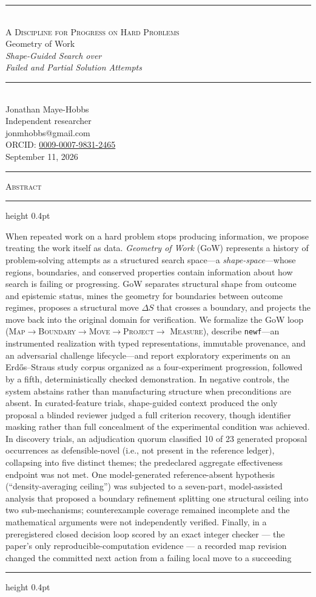 \documentclass[11pt]{article}
\makeatletter
\newcommand{\gowtitlepage}{%
  \begin{titlepage}
  \thispagestyle{empty}
  \centering
  \vspace*{\stretch{1}}
  {\color{gowaccent}\rule{0.34\textwidth}{1.2pt}}\\[2.2em]
  {\normalfont\scshape\fontsize{15}{18}\selectfont\color{gowsoft}%
    A Discipline for Progress on Hard Problems}\\[2.4em]
  {\normalfont\fontsize{34}{40}\selectfont\color{gowink}%
    Geometry of Work}\\[0.9em]
  {\normalfont\itshape\fontsize{16}{20}\selectfont\color{gowink}%
    Shape-Guided Search over\\ Failed and Partial Solution Attempts}\\[2.6em]
  {\color{gowrule}\rule{0.16\textwidth}{0.5pt}}\\[2.4em]
  {\normalfont\large Jonathan Maye-Hobbs\,\orcidlink{0009-0007-9831-2465}}\\[0.6em]
  {\footnotesize\color{gowsoft} Independent researcher}\\[0.2em]
  {\footnotesize\ttfamily\color{gowsoft} jonmhobbs@gmail.com}\\[0.2em]
  {\footnotesize\color{gowsoft} ORCID: \href{https://orcid.org/0009-0007-9831-2465}{0009-0007-9831-2465}}\\
  \vspace{\stretch{1.4}}
  {\footnotesize\color{gowsoft} September 11, 2026}\\[0.8em]
  {\color{gowaccent}\rule{0.34\textwidth}{1.2pt}}
  \vspace*{\stretch{0.4}}
  \end{titlepage}%
}
\renewenvironment{abstract}{%
  \begin{center}
  \begin{minipage}{0.86\textwidth}
  \begin{center}{\normalfont\scshape\color{gowaccent}Abstract}\end{center}
  \vspace{0.4em}
  {\color{gowrule}\hrule height 0.4pt}
  \vspace{0.9em}
  \small\noindent\ignorespaces
}{%
  \vspace{0.9em}
  {\color{gowrule}\hrule height 0.4pt}
  \end{minipage}
  \end{center}
  \vspace{1.2em}
}
\theoremstyle{gowthm}
\theoremstyle{gowplain}
\makeatother
\begin{document}
\gowtitlepage

\clearpage
{}
\thispagestyle{empty}
\tableofcontents
\clearpage
{}

\begin{abstract}
When repeated work on a hard problem stops producing information, we propose
treating the work itself as data. \emph{Geometry of Work} (GoW) represents a
history of problem-solving attempts as a structured search space---a
\emph{shape-space}---whose regions, boundaries, and conserved properties contain
information about how search is failing or progressing. GoW separates structural
shape from outcome and epistemic status, mines the geometry for boundaries
between outcome regimes, proposes a structural move $\Delta S$ that crosses a
boundary, and projects the move back into the original domain for verification.
We formalize the GoW loop
(\textsc{Map}$\to$\textsc{Boundary}$\to$\textsc{Move}$\to$\textsc{Project}$\to$
\textsc{Measure}), describe \texttt{newf}---an instrumented realization with
typed representations, immutable provenance, and an adversarial challenge
lifecycle---and report exploratory experiments on an Erd\H{o}s--Straus study
corpus organized as a four-experiment progression, followed by a fifth,
deterministically checked demonstration. In negative controls, the
system abstains rather than manufacturing structure when preconditions are
absent. In curated-feature trials, shape-guided context produced the only
proposal a blinded reviewer judged a full criterion recovery, though identifier
masking rather than full concealment of the experimental condition was
achieved. In discovery trials, an adjudication quorum classified 10 of 23
generated proposal occurrences as defensible-novel (i.e., not present in the
reference ledger), collapsing into five distinct themes; the predeclared aggregate effectiveness
endpoint was not met. One model-generated reference-absent hypothesis
(``density-averaging ceiling'') was subjected to a seven-part, model-assisted
analysis that proposed a boundary refinement splitting one structural ceiling
into two sub-mechanisms; counterexample coverage remained incomplete and the
mathematical arguments were not independently verified. Finally, in a
preregistered closed decision loop scored by an exact integer checker --- the
paper's only reproducible-computation evidence --- a recorded map revision
changed the committed next action from a failing local move to a succeeding

\end{abstract}
\end{document}
